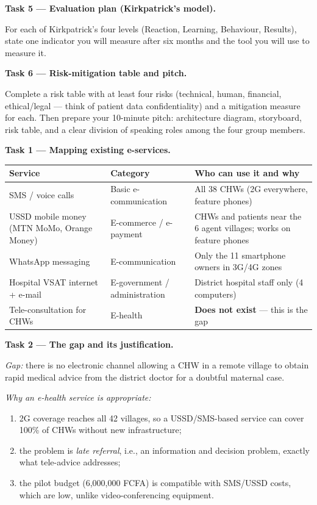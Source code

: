 \documentclass[11pt]{article}
\newcounter{popsec}
\newcounter{popsub}
\newcommand{\courssub}[1]{%
  \stepcounter{popsub}%
  \par\vspace{9pt}\noindent{\popxbold\fontsize{11.5}{13}\selectfont\color{popink}{\color{poporange}\thepopsec.\thepopsub}\hspace{6pt}#1}\par\nopagebreak\vspace{4pt}
}
\begin{document}
\textbf{Task 5 — Evaluation plan (Kirkpatrick's model).}\par
For each of Kirkpatrick's four levels (Reaction, Learning, Behaviour, Results), state one indicator you will measure after six months and the tool you will use to measure it.

\textbf{Task 6 — Risk-mitigation table and pitch.}\par
Complete a risk table with at least four risks (technical, human, financial, ethical/legal — think of patient data confidentiality) and a mitigation measure for each. Then prepare your 10-minute pitch: architecture diagram, storyboard, risk table, and a clear division of speaking roles among the four group members.

\courssub{Model answer}

\textbf{Task 1 — Mapping existing e-services.}

\begin{center}
\begin{tabularx}{\linewidth}{|l|l|X|}
\hline
\rowcolor{popblueL} \textbf{Service} & \textbf{Category} & \textbf{Who can use it and why} \\
\hline
SMS / voice calls & Basic e-communication & All 38 CHWs (2G everywhere, feature phones) \\
\hline
USSD mobile money (MTN MoMo, Orange Money) & E-commerce / e-payment & CHWs and patients near the 6 agent villages; works on feature phones \\
\hline
WhatsApp messaging & E-communication & Only the 11 smartphone owners in 3G/4G zones \\
\hline
Hospital VSAT internet + e-mail & E-government / administration & District hospital staff only (4 computers) \\
\hline
Tele-consultation for CHWs & E-health & \textbf{Does not exist} — this is the gap \\
\hline
\end{tabularx}
\end{center}

\textbf{Task 2 — The gap and its justification.}\par
\emph{Gap:} there is no electronic channel allowing a CHW in a remote village to obtain rapid medical advice from the district doctor for a doubtful maternal case.

\emph{Why an e-health service is appropriate:}
\begin{enumerate}
\item 2G coverage reaches all 42 villages, so a USSD/SMS-based service can cover 100\% of CHWs without new infrastructure;
\item the problem is \emph{late referral}, i.e., an information and decision problem, exactly what tele-advice addresses;
\item the pilot budget (6,000,000 FCFA) is compatible with SMS/USSD costs, which are low, unlike video-conferencing equipment.
\end{enumerate}
\end{document}
